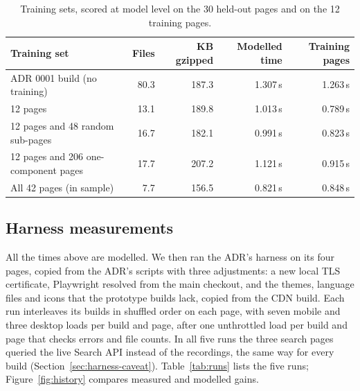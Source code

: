 \documentclass[11pt]{article}
\begin{document}
\begin{table}[t]
\centering\small
\caption{Training sets, scored at model level on the 30 held-out pages and on the 12 training pages.}
\label{tab:variants}
\begin{tabular}{lrrrr}
\toprule
Training set & Files & KB gzipped & Modelled time & Training pages\\
\midrule
ADR 0001 build (no training) & 80.3 & 187.3 & 1.307\,s & 1.263\,s\\
12 pages & 13.1 & 189.8 & 1.013\,s & 0.789\,s\\
12 pages and 48 random sub-pages & 16.7 & 182.1 & 0.991\,s & 0.823\,s\\
12 pages and 206 one-component pages & 17.7 & 207.2 & 1.121\,s & 0.915\,s\\
All 42 pages (in sample) & 7.7 & 156.5 & 0.821\,s & 0.848\,s\\
\bottomrule
\end{tabular}
\end{table}

\subsection{Harness measurements}\label{sec:runs}
All the times above are modelled. We then ran the ADR's harness on its four pages, copied from the ADR's scripts with three adjustments: a new local TLS certificate, Playwright resolved from the main checkout, and the themes, language files and icons that the prototype builds lack, copied from the CDN build. Each run interleaves its builds in shuffled order on each page, with seven mobile and three desktop loads per build and page, after one unthrottled load per build and page that checks errors and file counts. In all five runs the three search pages queried the live Search API instead of the recordings, the same way for every build (Section~\ref{sec:harness-caveat}). Table~\ref{tab:runs} lists the five runs; Figure~\ref{fig:history} compares measured and modelled gains.
\end{document}
